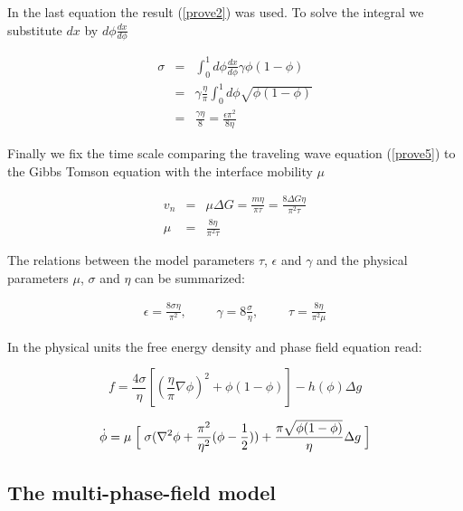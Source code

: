 In the last equation the result (\ref{prove2}) was used. To solve the integral we substitute $dx$ by $d\phi \frac {dx}{d\phi}$

\begin{eqnarray}\label{eindeInterfaceEnergy2}
 \nonumber \sigma &=& \int_0^1 d\phi \frac {dx}{d\phi} \gamma \phi (1-\phi) \label{l19} \\
 \nonumber &=& \gamma \frac\eta\pi \int_0^1 d\phi \sqrt{\phi(1-\phi)} \\
  &=&  \frac{\gamma \eta}8  = \frac{\epsilon \pi^2}{8 \eta}
\end{eqnarray}

Finally we fix the time scale comparing the traveling wave equation (\ref{prove5}) to the Gibbs Tomson equation with the interface mobility $\mu$

\begin{eqnarray}
  \label{GT}
  \nonumber  v_n &=& \mu \Delta G = \frac {m\eta}{\pi\tau} = \frac {8 \Delta G \eta}{\pi^2\tau} \\
  \mu &=& \frac {8 \eta}{\pi^2\tau}
\end{eqnarray}

The relations between the model parameters $\tau$, $\epsilon$ and $\gamma$ and the physical parameters $\mu$, $\sigma$ and $\eta$ can be summarized:

\begin{eqnarray}\label{relationsDO}
 \epsilon = \frac{8\sigma\eta}{\pi^2} \mbox{,}\;\;\;\; \;\;\;\;\; \gamma = 8\frac{\sigma}{\eta} \mbox{,}\;\;\;\; \;\;\;\;\;  \tau = \frac{8\eta}{\pi^2\mu}
\end{eqnarray}

In the physical units the free energy density and phase field equation read:

\begin{equation}
  \label{freeEnergyDensity_Phys}
  f =  \frac {4\sigma}{\eta} [ (\frac\eta{\pi}\nabla \phi )^2 + \phi(1-\phi)] - h(\phi) \Delta g
\end{equation}

\begin{equation}
  \label{relaxPhi_Phys}
  \dot{\phi} = \mu \Bigm[\sigma ( \nabla^2 \phi + \frac{\pi^2}{\eta^2}(\phi-\frac12)) + \frac{\pi\sqrt{\phi(1-\phi)}}{\eta} \Delta g\Bigm]
\end{equation}



\subsection{The multi-phase-field model}\label{mpf}



